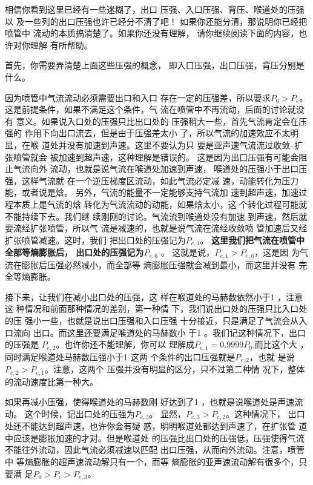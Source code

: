 \begin{notice}

\hspace{2em}
相信你看到这里已经有一些迷糊了，出口
压强、入口压强、背压、喉道处的压强以
及一些列的出口压强也许已经分不清了吧！
如果你还能分清，那说明你已经把喷管中
流动的本质搞清楚了。如果你还没有理解，
请你继续阅读下面的内容，也许对你理解
有所帮助。

\hspace{2em}
首先，你需要弄清楚上面这些压强的概念，
即入口压强，出口压强，背压分别是什么。

\hspace{2em}
因为喷管中气流流动必须需要出口和入口
存在一定的压强差，所以要求$P_0>P_e$。
这是前提条件，如果不满足这个条件，气
流在喷管中不再流动，后面的讨论就没有
意义。如果说入口处的压强只比出口处的
压强稍大一些，首先气流肯定会在压强的
作用下向出口流去，但是由于压强差太小
了，所以气流的加速效应不太明显，在喉
道处并没有加速到声速。这里不要认为只
要是亚声速气流流过收敛--扩张喷管就会
被加速到超声速，这种理解是错误的。
这是因为出口压强有可能会阻止气流向外
流动，也就是说气流在喉道处加速到声速，
喉道处的压强小于出口压强，这样气流就
在一个逆压梯度区流动，如此气流必定减
速，动能转化为压力能，或者说是焓。
另外，气流的能量不一定能够支持气流加
速到超声速，加速过程本质上是气流的焓
转化为气流流动的动能，如果焓太小，这
个转化过程可能就不能持续下去。我们继
续刚刚的讨论。气流流到喉道处没有加速
到声速，然后就要流经扩张喷管，所以气
流是减速的，也就是说气流在流经收敛喷
管加速后又经扩张喷管减速。这时，我们
把出口处的压强记为$P_{e,1} $。
{{\color{noteorange}\bfseries 
这里我们把气流在喷管中全部等熵膨胀后，
出口处的压强记为$P_{e,6} $ }}。
这就是说，$P_{e,1}>P_{e,6} $，这是因
为气流在膨胀后压强必然减小，而全部等
熵膨胀压强就会减到最小，而这里并没有
完全等熵膨胀。

\hspace{2em}
接下来，让我们在减小出口处的压强，这
样在喉道处的马赫数依然小于1 ，注意这
种情况和前面那种情况的差别，第一种情
下，我们说出口处的压强只比入口处的压
强小一些，也就是说出口压强和入口压强
十分接近，只是满足了气流会从入口流向
出口。而这里还要满足喉道处的马赫数小
于1 。我们记这种情况下，出口的压强是
$P_{e,2} $。也许你还不能理解，你可以
理解成$P_{e,1}=0.9999P_0$,而比这个大
，同时满足喉道处马赫数压强小于1 这两
个条件的出口压强就是$P_{e,2} $，也就
是说$P_{e,2}> P_{e,1}$。注意，这两个
压强并没有明显的区分，只不过第二种情
况下，整体的流动速度比第一种大。

\hspace{2em}
如果再减小压强，使得喉道处的马赫数刚
好达到了1 ，也就是说喉道处是声速流动。
这个时候，记出口处的压强为$P_{e,3} $。
显然，$P_{e,3}>P_{e,2} $。这种情况下，
出口处还不能达到超声速，也许你会有疑
惑，明明喉道处都达到声速了，在扩张管
道中应该是膨胀加速的才对。但是喉道处
的压强比出口处的压强低，压强使得气流
不能往外流动，因此气流必须减速以匹配
出口压强，从而向外流动。注意，喷管中
等熵膨胀的超声速流动解只有一个，而等
熵膨胀的亚声速流动解有很多个，只要满
足$P_0>P_e>P_{e,3} $。


\end{notice}
